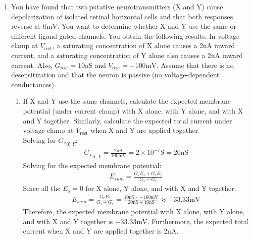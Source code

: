\documentclass[11pt]{article}
\begin{document}
\begin{enumerate}[label=\arabic*.]
\newpage
\item
You have found that two putative neurotransmitters (X and Y) cause depolarization of isolated retinal horizontal cells and that both responses reverse at $0 \text{mV}$. You want to determine whether X and Y use the same or different ligand-gated channels. You obtain the following results. In voltage clamp at $V_{\text{rest}}$, a saturating concentration of X alone causes a $2 \text{nA}$ inward current, and a saturating concentration of Y alone also causes a $2 \text{nA}$ inward current. Also, $G_{\text{rest}} = 10 \text{nS}$ and $V_{\text{rest}} = -100 \text{mV}$. Assume that there is no desensitization and that the neuron is passive (no voltage-dependent conductances).
\begin{enumerate}[label=(\alph*)]
\item
If X and Y use the same channels, calculate the expected membrane potential (under current clamp) with X alone, with Y alone, and with X and Y together. Similarly, calculate the expected total current under voltage clamp at $V_{\text{rest}}$ when X and Y are applied together.
\vspace*{1\baselineskip}
\\
Solving for ${G_s}_{X, Y}$:
\begin{align*}
{{G_{s}}_{X, Y}} = \frac{2 \text{nA}} {100 \text{mV}} = 2 \times 10^{-7} \text{S} = 20 \text{nS}
\end{align*}
Solving for the expected membrane potential:
\begin{align*}
E_{sum} = \frac{G_s E_s + G_r E_r} {G_s + G_r}
\end{align*}
Since all the $E_s = 0$ for X alone, Y alone, and with X and Y together:
\begin{align*}
E_{sum} = \frac{G_r E_r} {G_s + G_r} = \frac{10 \text{nS} \times -100 \text{mV}} {20 \text{nS} + 10 \text{nS}} \approx -33.33 \text{mV}
\end{align*}
Therefore, the expected membrane potential with X alone, with Y alone, and with X and Y together is $-33.33 \text{mV}$. Furthermore, the expected total current when X and Y are applied together is $2 \text{nA}$.




\end{enumerate}
\end{enumerate}
\end{document}
